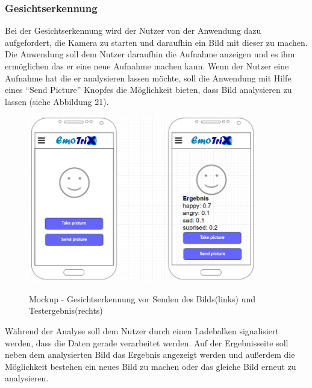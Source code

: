 \subsubsection{Gesichtserkennung}
\label{section:Mockup-Gesichtserkennung}
Bei der Gesichtserkennung wird der Nutzer von der Anwendung dazu aufgefordert, die Kamera zu starten und daraufhin ein Bild mit dieser zu machen. Die Anwendung soll dem Nutzer daraufhin die Aufnahme anzeigen und es ihm ermöglichen das er eine neue Aufnahme machen kann. Wenn der Nutzer eine Aufnahme hat die er analysieren lassen möchte, soll die Anwendung mit Hilfe eines ``Send Picture'' Knopfes die Möglichkeit bieten, dass Bild analysieren zu lassen (siehe Abbildung 21). \newline
\begin{figure}[h]
	\centering
	\includegraphics[width=10cm]{Bilder/Mockup-Gesichtserkennung.png}
	\label{img:Mockup-Gesichtserkennung}
	\caption[Mockup - Gesichtserkennung vor Senden des Bilds(links) und Testergebnis(rechts)]{Mockup - Gesichtserkennung vor Senden des Bilds(links) und Testergebnis(rechts)}
\end{figure} \newline
Während der Analyse soll dem Nutzer durch einen Ladebalken signalisiert werden, dass die Daten gerade verarbeitet werden. Auf der Ergebnisseite soll neben dem analysierten Bild das Ergebnis angezeigt werden und außerdem die Möglichkeit bestehen ein neues Bild zu machen oder das gleiche Bild erneut zu analysieren.

